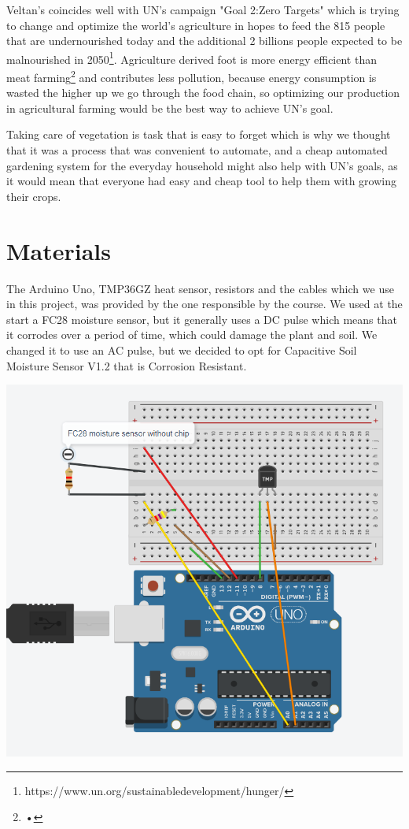 \documentclass{article}
\begin{document}
Veltan's coincides well with UN's campaign "Goal 2:Zero Targets" which is trying to change and optimize the world's agriculture in hopes to feed the 815 people that are undernourished today and the additional 2 billions people expected to be malnourished in 2050\footnote{https://www.un.org/sustainabledevelopment/hunger/}. Agriculture derived foot is more energy efficient than meat farming\footnote{•} and contributes less pollution, because energy consumption is wasted the higher up we go through the food chain, so optimizing our production in agricultural farming would be the best way to achieve UN's goal. 

Taking care of vegetation is task that is easy to forget which is why we thought that it was a process that was convenient to automate, and a cheap automated gardening system for the everyday household might also help with UN's goals, as it would mean that everyone had easy and cheap tool to help them with growing their crops.

\section{Materials}
The Arduino Uno, TMP36GZ heat sensor, resistors and the cables which we use in this project, was provided by the one responsible by the course. We used at the start a FC28 moisture sensor, but it generally uses a DC pulse which means that it corrodes over a period of time, which could damage the plant and soil. We changed it to use an AC pulse, but we decided to opt for Capacitive Soil Moisture Sensor V1.2 that is Corrosion Resistant.


\includegraphics[scale = 0.50]{FC-28-Diagram.PNG}
\end{document}
